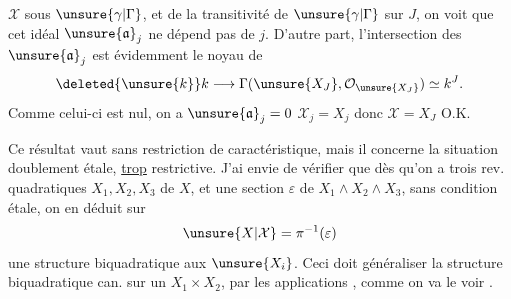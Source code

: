 $\mathcal X$ sous $\unsure{\gamma|\Gamma}$, et de la transitivité de $\unsure{\gamma|\Gamma}$ sur $J$, on voit que cet idéal $\unsure{\mathfrak a}_j$ ne dépend pas de $j$. D'autre part, l'intersection des $\unsure{\mathfrak a}_j$ est évidemment le noyau de
\[
 \deleted{\unsure{k}}k\longrightarrow\Gamma(\unsure{X_J},\mathcal O_{\unsure{X_J}})\simeq k^J.
\]
Comme celui-ci est nul, on a $\unsure{\mathfrak a}_j=0$  $\mathcal X_j=X_j$ donc $\mathcal X=X_J$ O.K.

Ce résultat vaut sans restriction de caractéristique, mais il concerne la situation doublement étale, \uline{trop} restrictive. J'ai envie de vérifier que dès qu'on a trois rev. quadratiques $X_1,X_2,X_3$ de $X$, et une section $\varepsilon$ de $X_1\wedge X_2\wedge X_3$, sans condition étale, on en déduit sur
\[
 \unsure{X|\mathcal X}=\pi^{-1}(\varepsilon)
\]
une structure biquadratique  aux $\unsure{X_i}$. Ceci doit généraliser la structure biquadratique can. sur un $X_1\times X_2$, par les applications
,
comme on va le voir .
